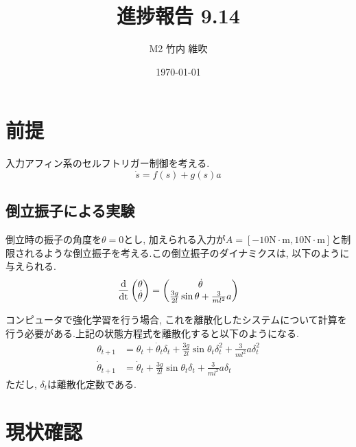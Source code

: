 \documentclass{jsarticle}
\title{\large{\bf{進捗報告 9.14}}}
\author{M2 竹内 維吹}
\date{\today}
\newcommand{\odif}[2]{\frac{\rm{d}#1}{\rm{d}#2}}
\begin{document}
\maketitle


\section{前提}
入力アフィン系のセルフトリガー制御を考える. 
\begin{equation}
	\dot{s} = f(s) + g(s)a \label{continuous}
\end{equation}

\subsection{倒立振子による実験}
倒立時の振子の角度を$\theta=0$とし, 加えられる入力が$A=[-10\textrm{N}\cdot\textrm{m},10\textrm{N}\cdot\textrm{m}]$と制限されるような倒立振子を考える.この倒立振子のダイナミクスは, 以下のように与えられる.
\begin{equation}
	\odif{}{t}\begin{pmatrix}\theta \\ \dot{\theta}\end{pmatrix} = 
		\begin{pmatrix}\dot{\theta} \\ \frac{3g}{2l}\sin{\theta} + \frac{3}{ml^2}a \end{pmatrix} \label{pendulum}
\end{equation}

コンピュータで強化学習を行う場合, これを離散化したシステムについて計算を行う必要がある.上記の状態方程式を離散化すると以下のようになる.
\begin{align}
	\theta_{t+1} &= \theta_t+\dot{\theta}_t\delta_t+\frac{3g}{2l}\sin{\theta_t}\delta_t^2+\frac{3}{ml^2}a\delta_t^2 \tag{3a}\\
	\dot{\theta}_{t+1} &=  \dot{\theta}_t+\frac{3g}{2l}\sin{\theta_t}\delta_t+\frac{3}{ml^2}a\delta_t \tag{3b}
\end{align}\label{pend}
\setcounter{equation}{3}
ただし, $\delta_t$は離散化定数である.\par


\section{現状確認}
\end{document}
